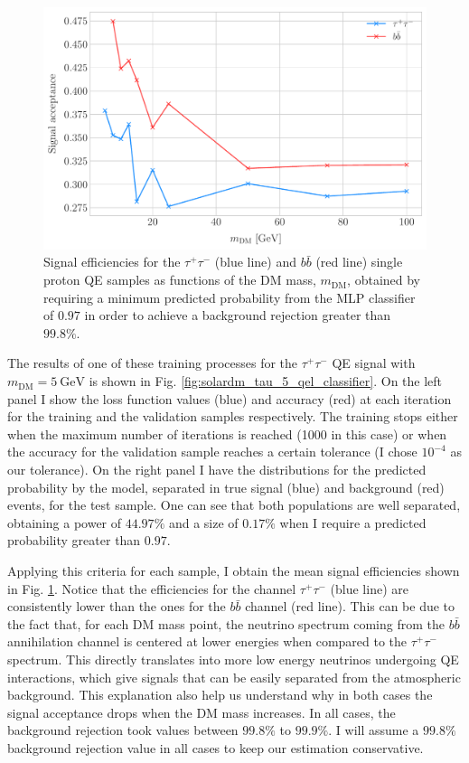 \begin{figure}[t]
	\centering
	\includegraphics[width=0.9\linewidth]{Images/DM_Analysis/solardm_qel_signal_acceptance.pdf}
	\caption[Signal efficiencies for the $\tau^{+} \tau^{-}$ and $b\bar{b}$ single proton QE samples as functions of the DM mass.]{Signal efficiencies for the $\tau^{+} \tau^{-}$ (blue line) and $b\bar{b}$ (red line) single proton QE samples as functions of the DM mass, $m_{\mathrm{DM}}$, obtained by requiring a minimum predicted probability from the MLP classifier of $0.97$ in order to achieve a background rejection greater than $99.8\%$.}
	\label{fig:solardm_qel_signal_acceptance}
\end{figure}

The results of one of these training processes for the $\tau^{+}\tau^{-}$ QE signal with $m_{\mathrm{DM}} = 5 \ \mathrm{GeV}$ is shown in Fig. \ref{fig:solardm_tau_5_qel_classifier}. On the left panel I show the loss function values (blue) and accuracy (red) at each iteration for the training and the validation samples respectively. The training stops either when the maximum number of iterations is reached (1000 in this case) or when the accuracy for the validation sample reaches a certain tolerance (I chose $10^{-4}$ as our tolerance). On the right panel I have the distributions for the predicted probability by the model, separated in true signal (blue) and background (red) events, for the test sample. One can see that both populations are well separated, obtaining a power of $44.97\%$ and a size of $0.17\%$ when I require a predicted probability greater than $0.97$.

Applying this criteria for each sample, I obtain the mean signal efficiencies shown in Fig. \ref{fig:solardm_qel_signal_acceptance}. Notice that the efficiencies for the  channel $\tau^{+}\tau^{-}$ (blue line) are consistently lower than the ones for the $b\bar{b}$ channel (red line). This can be due to the fact that, for each DM mass point, the neutrino spectrum coming from the $b\bar{b}$ annihilation channel is centered at lower energies when compared to the $\tau^{+}\tau^{-}$ spectrum. This directly translates into more low energy neutrinos undergoing QE interactions, which give signals that can be easily separated from the atmospheric background. This explanation also help us understand why in both cases the signal acceptance drops when the DM mass increases. In all cases, the background rejection took values between $99.8\%$ to $99.9\%$. I will assume a $99.8\%$ background rejection value in all cases to keep our estimation conservative.

